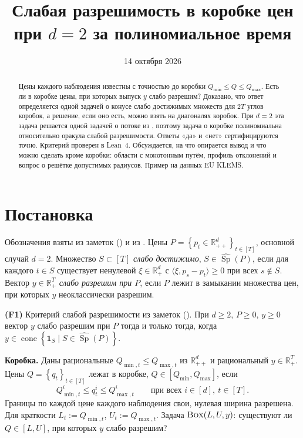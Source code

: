 \documentclass[a4paper,11pt]{article}
\title{Слабая разрешимость в коробке цен при $d=2$ за полиномиальное время}
\author{}
\date{14 октября 2026}
\newcommand{\lean}[1]{\mbox{\path{#1}}}
\theoremstyle{plain}
\theoremstyle{definition}
\theoremstyle{remark}
\newcommand{\R}{\mathbb{R}}
\newcommand{\set}[1]{\left\{ #1 \right\}}
\newcommand{\ip}[2]{\langle #1, #2\rangle}
\newcommand{\Rpp}[1][2]{\R^{#1}_{++}}
\newcommand{\Rp}[1][2]{\R^{#1}_{+}}
\DeclareMathOperator{\cone}{cone}
\DeclareMathOperator{\Sp}{Sp}
\newcommand{\Sw}{\widehat{\Sp}}
\newcommand{\BOX}{\textup{\textsc{Box}}}
\begin{document}
\maketitle

\begin{abstract}
Цены каждого наблюдения известны с точностью до коробки $Q_{\min}\le Q\le Q_{\max}$. Есть ли в коробке цены, при которых выпуск $y$ слабо разрешим? Доказано, что ответ определяется одной задачей о конусе слабо достижимых множеств для $2T$ углов коробок, а решение, если оно есть, можно взять на диагоналях коробок. При $d=2$ эта задача решается одной задачей о потоке из , поэтому задача о коробке полиномиальна относительно оракула слабой разрешимости. Ответы «да» и «нет» сертифицируются точно. Критерий проверен в Lean~4. Обсуждается, на что опирается вывод и что можно сделать кроме коробки: области с монотонным путём, профиль отклонений и вопрос о решётке допустимых радиусов. Пример на данных EU KLEMS.
\end{abstract}

\section{Постановка}\label{sec:setup}

Обозначения взяты из заметок () и из . Цены $P=\set{p_t\in\Rpp[d]}_{t\in[T]}$, основной случай $d=2$. Множество $S\subset[T]$ \emph{слабо достижимо}, $S\in\Sw(P)$, если для каждого $t\in S$ существует ненулевой $\xi\in\Rp[d]$ с $\ip{\xi}{p_s-p_t}\ge0$ при всех $s\notin S$. Вектор $y\in\Rp[T]$ \emph{слабо разрешим при $P$}, если $P$ лежит в замыкании множества цен, при которых $y$ неоклассически разрешим.

\textbf{(F1)} Критерий слабой разрешимости из заметок (\lean{NeoTiling.weakSolvable_iff}). При $d\ge2$, $P\ge0$, $y\ge0$ вектор $y$ слабо разрешим при $P$ тогда и только тогда, когда $y\in\cone\set{\mathbf 1_S\mid S\in\Sw(P)}$.

\textbf{Коробка.} Даны рациональные $Q_{\min,t}\le Q_{\max,t}$ из $\Rpp[d]$ и рациональный $y\in\Rp[T]$. Цены $Q=\set{q_t}_{t\in[T]}$ лежат в коробке, $Q\in[Q_{\min},Q_{\max}]$, если
\[
    Q^i_{\min,t}\le q^i_t\le Q^i_{\max,t}\qquad\text{при всех } i\in[d],\ t\in[T].
\]
Границы по каждой цене каждого наблюдения свои, нулевая ширина разрешена. Для краткости $L_t:=Q_{\min,t}$, $U_t:=Q_{\max,t}$. Задача $\BOX(L,U,y)$: существуют ли $Q\in[L,U]$, при которых $y$ слабо разрешим?
\end{document}

